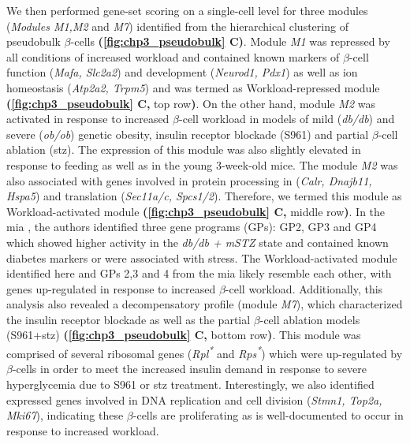\par We then performed gene-set scoring on a single-cell level for three modules (\textit{Modules M1,M2} and \textit{M7}) identified from the hierarchical clustering of pseudobulk $\beta$-cells \textbf{(\autoref{fig:chp3_pseudobulk} C)}. Module \textit{M1} was repressed by all conditions of increased workload and contained known markers of $\beta$-cell function (\textit{Mafa, Slc2a2}) and development (\textit{Neurod1, Pdx1}) as well as ion homeostasis (\textit{Atp2a2, Trpm5}) and was termed as Workload-repressed module \textbf{(\autoref{fig:chp3_pseudobulk} C,} top row\textbf{)}. On the other hand, module \textit{M2} was activated in response to increased $\beta$-cell workload in models of mild (\textit{db/db}) and severe (\textit{ob/ob}) genetic obesity, insulin receptor blockade (S961) and partial $\beta$-cell ablation (\gls{stz}). The expression of this module was also slightly elevated in response to feeding as well as in the young 3-week-old mice. The module \textit{M2} was also associated with genes involved in protein processing in  (\textit{Calr, Dnajb11, Hspa5}) and translation (\textit{Sec11a/c, Spcs1/2}). Therefore, we termed this module as Workload-activated module \textbf{(\autoref{fig:chp3_pseudobulk} C,} middle row\textbf{)}. In the \gls{mia} \textbf{\cite{hrovatin_delineating_2023}}, the authors identified three gene programs (GPs): GP2, GP3 and GP4 which showed higher activity in the \textit{db/db + mSTZ} state and contained known diabetes markers or were associated with  stress. The Workload-activated module identified here and GPs 2,3 and 4 from the \gls{mia} likely resemble each other, with genes up-regulated in response to increased $\beta$-cell workload. Additionally, this analysis also revealed a decompensatory profile (module \textit{M7}), which characterized the insulin receptor blockade as well as the partial $\beta$-cell ablation models (S961+\gls{stz}) \textbf{(\autoref{fig:chp3_pseudobulk} C,} bottom row\textbf{)}. This module was comprised of several ribosomal genes (\textit{Rpl\textsuperscript{*}} and \textit{Rps\textsuperscript{*}}) which were up-regulated by $\beta$-cells in order to meet the increased insulin demand in response to severe hyperglycemia due to S961 or \gls{stz} treatment. Interestingly, we also identified expressed genes involved in DNA replication and cell division (\textit{Stmn1, Top2a, Mki67}), indicating these $\beta$-cells are proliferating as is well-documented to occur in response to increased workload.\\

